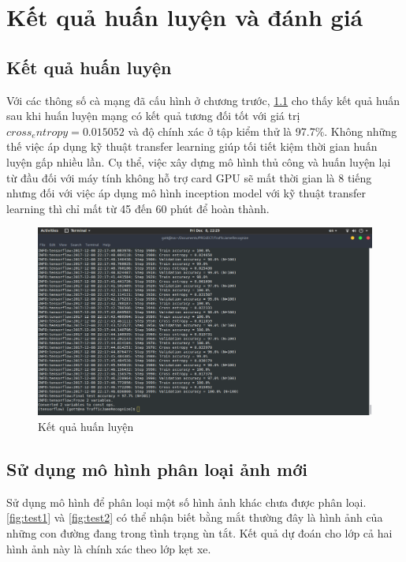 \chapter{Kết quả huấn luyện và đánh giá}
\section{Kết quả huấn luyện}
Với các thông số cà mạng đã cấu hình ở chương trước, \ref{fig:res} cho thấy kết quả huấn sau khi huấn luyện mạng có kết quả tương đối tốt với giá trị \(cross_entropy = 0.015052\) và độ chính xác ở tập kiểm thử là 97.7\%. Không những thế việc áp dụng kỹ thuật transfer learning giúp tối tiết kiệm thời gian huấn luyện gấp nhiều lần. Cụ thể, việc xây dựng mô hình thủ công và huấn luyện lại từ đầu đối với máy tính không hỗ trợ card GPU sẽ mất thời gian là 8 tiếng nhưng đối với việc áp dụng mô hình inception model với kỹ thuật transfer learning thì chỉ mất từ 45 đến 60 phút để hoàn thành.
	\begin{figure}[h!]
		\centering
		\includegraphics[scale=0.3]{charts/res.png}
		\caption{Kết quả huấn luyện}
		\label{fig:res}
	\end{figure}

\section{Sử dụng mô hình phân loại ảnh mới}
	Sử dụng mô hình để phân loại một số hình ảnh khác chưa được phân loại. \ref{fig:test1} và \ref{fig:test2} có thể nhận biết bằng mắt thường đây là hình ảnh của những con đường đang trong tình trạng ùn tắt. Kết quả dự đoán cho lớp cả hai hình ảnh này là chính xác theo lớp kẹt xe.
	
